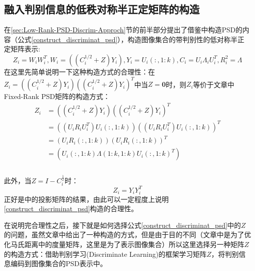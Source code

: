 \subsection{融入判别信息的低秩对称半正定矩阵的构造}
\label{sec:discrim_Low_Rank_PSD}
在\ref{sec:Low-Rank-PSD-Discrim-Approch}节的前半部分提出了借鉴\cite{PSD_AAAI}中构造PSD的内容（公式\ref{construct_discriminat_psd}），构造图像集合的带判别性的低对称半正定矩阵表示:
\begin{equation}
\label{construct_discriminat_psd}
Z_{i}=W_iW_{i}^{T},W_{i}=\left((C_{i}^{1/2}+Z) Y_{i}\right),Y_{i}=U_{i}(:,1:k),C_i=U_i\Lambda_iU_{i}^{T},R_{i}^{2}=\Lambda
\end{equation}
在这里先简单说明一下这种构造方式的合理性：在$Z_{i}=\left((C_{i}^{1/2}+Z)Y_{i}\right)\left((C_{i}^{1/2}+Z)Y_{i}\right)^{T}$中当$Z=\bm{0}$时，则$Z_{i}$等价于文章\cite{PSD_WACV}中Fixed-Rank PSD矩阵的构造方式：
\begin{equation}
\label{Fixed-Rank-PSD-Z0}
\begin{split}
Z_{i}&=\left((C_{i}^{1/2}+Z)Y_{i}\right)\left((C_{i}^{1/2}+Z)Y_{i}\right)^{T}\\
&=\left((U_{i}R_{i}U_{i}^{T})U_{i}(:,1:k)\right)\left((U_{i}R_{i}U_{i}^{T})U_{i}(:,1:k)\right)^{T}\\
&=\left(U_{i}R_{i}(:,1:k)\right)\left(U_{i}R_{i}(:,1:k)\right)^{T}\\
&=\left(U_{i}(:,1:k)\Lambda(1:k,1:k)U_{i}(:,1:k)^{T}\right)\\
\end{split}
\end{equation}\\
此外，当$Z=I-C_{i}^{\frac{1}{2}}$时：
\begin{equation}
\label{Fixed-Rank_PSD-Z_neg}
Z_i=Y_{i}Y_{i}^{T}
\end{equation}
正好是\cite{Subspace_GDA}中的投影矩阵的结果，由此可以一定程度上说明\ref{construct_discriminat_psd}构造的合理性。

在说明完合理性之后，接下就是如何选择公式\ref{construct_discriminat_psd}中的$Z$的问题，虽然文章\cite{PSD_AAAI}中给出了一种构造的方式，但是由于目的不同（文章\cite{PSD_AAAI}中是为了优化马氏距离中的度量矩阵，这里是为了表示图像集合）所以这里选择另一种矩阵$Z$的构造方式：借助判别学习(Discriminate Learning)的框架学习矩阵$Z$，将判别信息编码到图像集合的PSD表示中。

